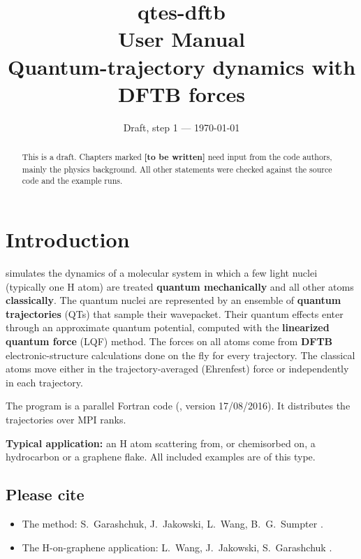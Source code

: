 \documentclass[11pt,a4paper]{report}
\title{\textbf{qtes-dftb}\\[0.5em]
  \Large User Manual\\[1em]
  \large Quantum-trajectory dynamics with DFTB forces}
\author{}
\date{Draft, step 1 --- \today}
\newcommand{\code}[1]{\texttt{\detokenize{#1}}}
\newcommand{\todo}[1][to be written]{\textbf{\textcolor{red!70!black}{[#1]}}}
\begin{document}
\maketitle

\begin{abstract}
\noindent This is a draft. Chapters marked \todo{} need input from the code
authors, mainly the physics background. All other statements were checked
against the source code and the example runs.
\end{abstract}

\tableofcontents

\chapter{Introduction}

\code{qtes-dftb} simulates the dynamics of a molecular system in which a
few light nuclei (typically one H atom) are treated \textbf{quantum
mechanically} and all other atoms \textbf{classically}. The quantum nuclei
are represented by an ensemble of \textbf{quantum trajectories} (QTs) that
sample their wavepacket. Their quantum effects enter through an approximate
quantum potential, computed with the \textbf{linearized quantum force} (LQF)
method. The forces on all atoms come from \textbf{DFTB} electronic-structure
calculations done on the fly for every trajectory. The classical atoms move
either in the trajectory-averaged (Ehrenfest) force or independently in
each trajectory.

The program is a parallel Fortran code (\code{bohmd}, version 17/08/2016).
It distributes the trajectories over MPI ranks.

\textbf{Typical application:} an H atom scattering from, or chemisorbed on,
a hydrocarbon or a graphene flake. All included examples are of this type.

\section*{Please cite}

\begin{itemize}
\item The method: S.~Garashchuk, J.~Jakowski, L.~Wang, B.~G.~Sumpter
  \cite{garashchuk2013}.
\item The H-on-graphene application: L.~Wang, J.~Jakowski, S.~Garashchuk
  \cite{wang2014}.
\end{itemize}
\end{document}
